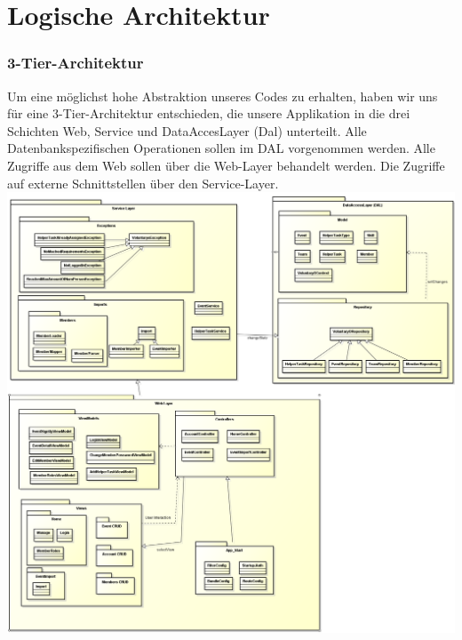 \chapter{Logische Architektur}
\subsection{3-Tier-Architektur}
		Um eine möglichst hohe Abstraktion unseres Codes zu erhalten, haben wir uns für eine 3-Tier-Architektur entschieden, die unsere Applikation in die drei Schichten Web, Service und DataAccesLayer (Dal) unterteilt. Alle Datenbankspezifischen Operationen sollen im DAL vorgenommen werden. Alle Zugriffe aus dem Web sollen über die Web-Layer behandelt werden. Die Zugriffe auf externe Schnittstellen über den Service-Layer.
\includegraphics[width=\textwidth]{content/architekturdokumentation/images/LogischeArchitektur.png}
